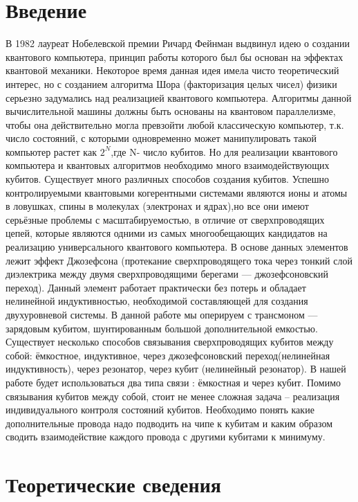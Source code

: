 \documentclass[12pt, a4paper, openany]{book}
\begin{document}
\tableofcontents
	\newpage

\chapter{Введение}
В 1982 лауреат Нобелевской премии Ричард Фейнман выдвинул идею о создании квантового компьютера, принцип работы которого был бы основан на эффектах квантовой механики. Некоторое время данная идея имела чисто теоретический интерес, но с созданием алгоритма Шора (факторизация целых чисел)
физики серьезно задумались над реализацией квантового компьютера. Алгоритмы данной
вычислительной машины должны быть основаны на квантовом параллелизме,
чтобы она действительно могла превзойти любой классическую компьютер, т.к. число состояний, с которыми одновременно может манипулировать такой компьютер растет как $2^N$,где N- число кубитов. Но для реализации квантового компьютера и квантовых алгоритмов необходимо много взаимодействующих кубитов. Существует много различных способов создания кубитов. Успешно контролируемыми квантовыми когерентными системами являются ионы и атомы в ловушках, спины в молекулах (электронах и ядрах),но все они имеют серьёзные проблемы с масштабируемостью, в отличие от сверхпроводящих цепей, которые являются одними из самых многообещающих кандидатов на реализацию универсального квантового компьютера. В
основе данных элементов лежит эффект Джозефсона (протекание сверхпроводящего тока через тонкий слой диэлектрика между двумя сверхпроводящими
берегами — джозефсоновский переход). Данный элемент работает практически без потерь и обладает нелинейной индуктивностью, необходимой составляющей для создания двухуровневой системы. В данной работе мы оперируем с трансмоном — зарядовым кубитом, шунтированным большой дополнительной емкостью. Существует несколько способов связывания сверхпроводящих кубитов между собой: ёмкостное, индуктивное, через джозефсоновский переход(нелинейная индуктивность), через резонатор, через кубит (нелинейный резонатор). В нашей работе будет использоваться два типа связи : ёмкостная и через кубит. Помимо связывания кубитов между собой, стоит не менее сложная задача -- реализация индивидуального контроля состояний кубитов. Необходимо понять какие дополнительные провода надо подводить на чипе к кубитам и каким образом сводить взаимодействие каждого провода с другими кубитами к минимуму.
\chapter{Теоретические сведения} \label{chap:theory}
\end{document}
